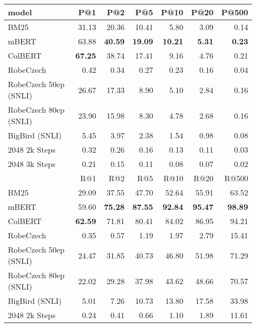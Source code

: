 \begin{table}[!htb]
    \centering
    \begin{tabular}{lrrrrrr}
        \toprule
        model &    P@1 &    P@2 &    P@5 &   P@10 &  P@20 &  P@500 \\
        \midrule
                                BM25 &  31.13 &  20.36 &  10.41 &   5.80 &  3.09 &   0.14 \\
                               mBERT &  63.88 &  \bf{40.59} &  \bf{19.09} &  \bf{10.21} &  \bf{5.31} &   \bf{0.23} \\
                             ColBERT &  \bf{67.25} &  38.74 &  17.41 &   9.16 &  4.76 &   0.21 \\
                           RobeCzech &   0.42 &   0.34 &   0.27 &   0.23 &  0.16 &   0.04 \\
               RobeCzech 50ep (SNLI) &  26.67 &  17.33 &   8.90 &   5.10 &  2.84 &   0.16 \\
               RobeCzech 80ep (SNLI) &  23.90 &  15.98 &   8.30 &   4.78 &  2.68 &   0.16 \\
                      BigBird (SNLI) &   5.45 &   3.97 &   2.38 &   1.54 &  0.98 &   0.08 \\
              \nystr{} 2048 2k Steps &   0.32 &   0.26 &   0.16 &   0.13 &  0.11 &   0.03 \\
              \nystr{} 2048 3k Steps &   0.21 &   0.15 &   0.11 &   0.08 &  0.07 &   0.02 \\
        \midrule
              {} &    R@1 &    R@2 &    R@5 &   R@10 &   R@20 &  R@500 \\
        \midrule
                  BM25 &  29.09 &  37.55 &  47.70 &  52.64 &  55.91 &  63.52 \\
                 mBERT &  59.60 &  \bf{75.28} &  \bf{87.55} &  \bf{92.84} &  \bf{95.47} &  \bf{98.89} \\
               ColBERT &  \bf{62.59} &  71.81 &  80.41 &  84.02 &  86.95 &  94.21 \\
             RobeCzech &   0.35 &   0.57 &   1.19 &   1.97 &   2.79 &  15.41 \\
 RobeCzech 50ep (SNLI) &  24.47 &  31.85 &  40.73 &  46.80 &  51.98 &  71.29 \\
 RobeCzech 80ep (SNLI) &  22.02 &  29.28 &  37.98 &  43.62 &  48.66 &  70.57 \\
        BigBird (SNLI) &   5.01 &   7.26 &  10.73 &  13.80 &  17.58 &  33.98 \\
\nystr{} 2048 2k Steps &   0.24 &   0.41 &   0.66 &   1.10 &   1.89 &  11.61 \\

\end{tabular}
\end{table}
